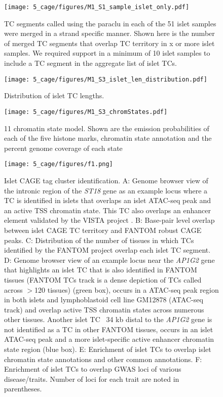 \begin{figure}
        \centering
        \texttt{[image: 5\_cage/figures/M1\_S1\_sample\_islet\_only.pdf]}
        \caption[Islet TC identification using CAGE data across multiple samples]{TC segments called using the paraclu in each of the 51 islet samples were merged in a strand specific manner. Shown here is the number of merged TC segments that overlap TC territory in x or more islet samples. We required support in a minimum of 10 islet samples to include a TC segment in the aggregate list of islet TCs.}
        \label{fig:c5_sf_islet_threshold}
\end{figure}


\begin{figure}
        \centering
        \texttt{[image: 5\_cage/figures/M1\_S3\_islet\_len\_distribution.pdf]}
        \caption[Islet TC length distribution]{Distribution of islet TC lengths.}
        \label{fig:c5_sf_tc_lengths}
\end{figure}


\begin{figure}
        \centering
        \texttt{[image: 5\_cage/figures/M1\_S3\_chromStates.pdf]}
        \caption[11 chromatin state model]{11 chromatin state model. Shown are the emission probabilities of each of the five histone marks, chromatin state annotation and the percent genome coverage of each state}
        \label{fig:c5_sf_chromstate}
\end{figure}


\begin{figure}
        \centering
        \texttt{[image: 5\_cage/figures/f1.png]}
        \caption[Islet CAGE tag cluster identification]{Islet CAGE tag cluster identification. A: Genome browser view of the intronic region of the \textit{ST18} gene as an example locus where a TC is identified in islets that overlaps an islet ATAC-seq peak and an active TSS chromatin state. This TC also overlaps an enhancer element validated by the VISTA project \cite{viselVISTAEnhancerBrowser2007}. B: Base-pair level overlap between islet CAGE TC territory and FANTOM robust CAGE peaks. C: Distribution of the number of tissues in which TCs identified by the FANTOM project overlap each islet TC segment. D: Genome browser view of an example locus near the \textit{AP1G2} gene that highlights an islet TC that is also identified in FANTOM tissues (FANTOM TCs track is a dense depiction of TCs called across $>$120 tissues) (green box), occurs in a ATAC-seq peak region in both islets and lymphoblastoid cell line GM12878 (ATAC-seq track) and overlap active TSS chromatin states across numerous other tissues. Another islet TC ~34 kb distal to the \textit{AP1G2} gene is not identified as a TC in other FANTOM tissues, occurs in an islet ATAC-seq peak and a more islet-specific active enhancer chromatin state region (blue box). E: Enrichment of islet TCs to overlap islet chromatin state annotations and other common annotations. F: Enrichment of islet TCs to overlap GWAS loci of various disease/traits. Number of loci for each trait are noted in parentheses.}
        \label{fig:c5_f1}
\end{figure}


